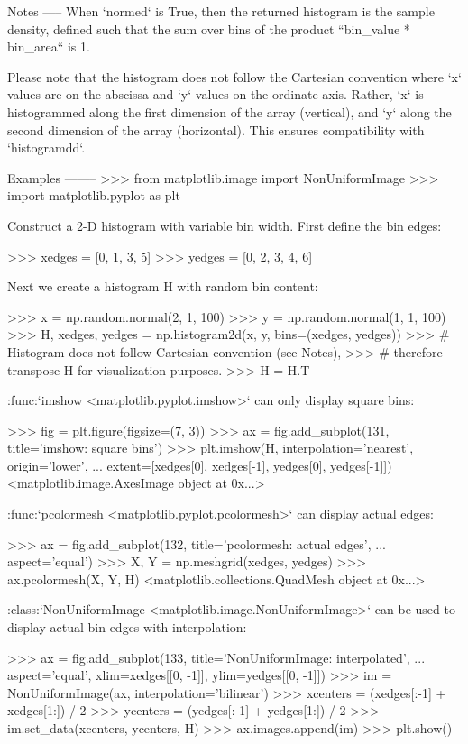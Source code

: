 \begin{DoxyVerb}
Notes
-----
When `normed` is True, then the returned histogram is the sample
density, defined such that the sum over bins of the product
``bin_value * bin_area`` is 1.

Please note that the histogram does not follow the Cartesian convention
where `x` values are on the abscissa and `y` values on the ordinate
axis.  Rather, `x` is histogrammed along the first dimension of the
array (vertical), and `y` along the second dimension of the array
(horizontal).  This ensures compatibility with `histogramdd`.

Examples
--------
>>> from matplotlib.image import NonUniformImage
>>> import matplotlib.pyplot as plt

Construct a 2-D histogram with variable bin width. First define the bin
edges:

>>> xedges = [0, 1, 3, 5]
>>> yedges = [0, 2, 3, 4, 6]

Next we create a histogram H with random bin content:

>>> x = np.random.normal(2, 1, 100)
>>> y = np.random.normal(1, 1, 100)
>>> H, xedges, yedges = np.histogram2d(x, y, bins=(xedges, yedges))
>>> # Histogram does not follow Cartesian convention (see Notes),
>>> # therefore transpose H for visualization purposes.
>>> H = H.T

:func:`imshow <matplotlib.pyplot.imshow>` can only display square bins:

>>> fig = plt.figure(figsize=(7, 3))
>>> ax = fig.add_subplot(131, title='imshow: square bins')
>>> plt.imshow(H, interpolation='nearest', origin='lower',
...         extent=[xedges[0], xedges[-1], yedges[0], yedges[-1]])
<matplotlib.image.AxesImage object at 0x...>

:func:`pcolormesh <matplotlib.pyplot.pcolormesh>` can display actual edges:

>>> ax = fig.add_subplot(132, title='pcolormesh: actual edges',
...         aspect='equal')
>>> X, Y = np.meshgrid(xedges, yedges)
>>> ax.pcolormesh(X, Y, H)
<matplotlib.collections.QuadMesh object at 0x...>

:class:`NonUniformImage <matplotlib.image.NonUniformImage>` can be used to
display actual bin edges with interpolation:

>>> ax = fig.add_subplot(133, title='NonUniformImage: interpolated',
...         aspect='equal', xlim=xedges[[0, -1]], ylim=yedges[[0, -1]])
>>> im = NonUniformImage(ax, interpolation='bilinear')
>>> xcenters = (xedges[:-1] + xedges[1:]) / 2
>>> ycenters = (yedges[:-1] + yedges[1:]) / 2
>>> im.set_data(xcenters, ycenters, H)
>>> ax.images.append(im)
>>> plt.show()\end{DoxyVerb}
 \mbox{\label{namespacenumpy_1_1lib_1_1twodim__base_a1475cbe0d8625d39a2e2a3b91dc0a44f}} 
